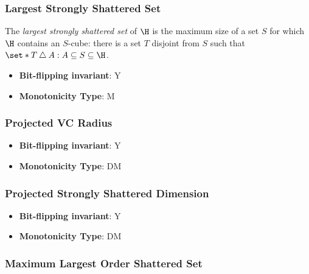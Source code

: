 \subsubsection{Largest Strongly Shattered Set}
      
      \begin{definition}\label{def:largest_strongly_shattered_set}
      The \emph{largest strongly shattered set} of $\H$ is the maximum size of a set $S$ for which $\H$ contains an $S$-cube: there is a set $T$ disjoint from $S$ such that $\set*{T\mathbin{\triangle} A:A\subseteq S}\subseteq\H$.
      \end{definition}
      \begin{itemize}
      \item {\bf Bit-flipping invariant}: Y
      \item {\bf Monotonicity Type}: M
      \end{itemize}
\subsubsection{Projected VC Radius}
      
      \begin{definition}\label{def:projected_vc_radius}
      
      \end{definition}
      \begin{itemize}
      \item {\bf Bit-flipping invariant}: Y
      \item {\bf Monotonicity Type}: DM
      \end{itemize}
\subsubsection{Projected Strongly Shattered Dimension}
      
      \begin{definition}\label{def:projected_strongly_shattered_dimension}
      
      \end{definition}
      \begin{itemize}
      \item {\bf Bit-flipping invariant}: Y
      \item {\bf Monotonicity Type}: DM
      \end{itemize}
\subsubsection{Maximum Largest Order Shattered Set}
      

